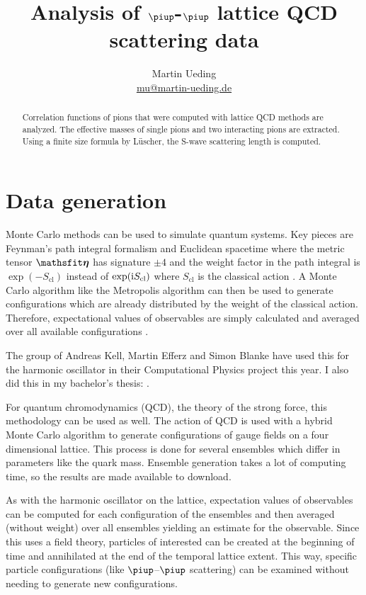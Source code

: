 \documentclass[11pt, english, fleqn, DIV=10, headinclude]{scrartcl}
\title{Analysis of $\piup$-$\piup$ lattice QCD scattering data}
\author{
    Martin Ueding \\ \small{\href{mailto:mu@martin-ueding.de}{mu@martin-ueding.de}}
}
\begin{document}
\maketitle

\begin{abstract}
    Correlation functions of pions that were computed with lattice QCD methods
    are analyzed. The effective masses of single pions and two interacting
    pions are extracted. Using a finite size formula by Lüscher, the S-wave
    scattering length is computed.
\end{abstract}

\tableofcontents

\newpage

\section{Data generation}

Monte Carlo methods can be used to simulate quantum systems. Key pieces are
Feynman's path integral formalism and Euclidean spacetime where the metric
tensor $\tens\eta$ has signature $\pm 4$ and the weight factor in the path
integral is $\exp(-S_\text{cl})$ instead of $\exp(\mathrm i S_\text{cl})$ where
$S_\text{cl}$ is the classical action
\parencite[Section~2]{Creutz/Statistical_Approach_QM}. A Monte Carlo algorithm
like the Metropolis algorithm can then be used to generate configurations which
are already distributed by the weight of the classical action. Therefore,
expectational values of observables are simply calculated and averaged over all
available configurations \parencite[(3.7)]{Creutz/Statistical_Approach_QM}.

The group of Andreas Kell, Martin Efferz and Simon Blanke have used this for
the harmonic oscillator in their Computational Physics project this year. I
also did this in my bachelor's thesis: \parencite{Ueding/Bachelorarbeit}.

For quantum chromodynamics (QCD), the theory of the strong force, this
methodology can be used as well. The action of QCD is used with a hybrid Monte
Carlo algorithm to generate configurations of gauge fields on a four
dimensional lattice. This process is done for several ensembles which differ in
parameters like the quark mass. Ensemble generation takes a lot of computing
time, so the results are made available to download.

As with the harmonic oscillator on the lattice, expectation values of
observables can be computed for each configuration of the ensembles and then
averaged (without weight) over all ensembles yielding an estimate for the
observable. Since this uses a field theory, particles of interested can be
created at the beginning of time and annihilated at the end of the temporal
lattice extent. This way, specific particle configurations (like
$\piup$–$\piup$ scattering) can be examined without needing to generate new
configurations.
\end{document}
